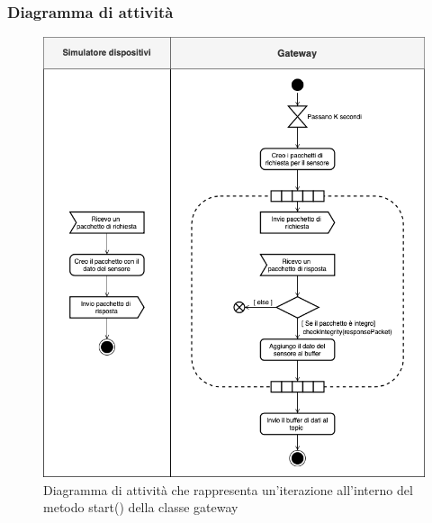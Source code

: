 	\subsubsection{Diagramma di attività}%
		\begin{figure}[H]
			\centering
			\includegraphics[scale=0.500]{res/images/GATEWAY/gateway.start().png}
			\caption{Diagramma di attività che rappresenta un'iterazione all'interno del metodo start() della classe gateway}
			\label{Diagramma 4}
		\end{figure}








